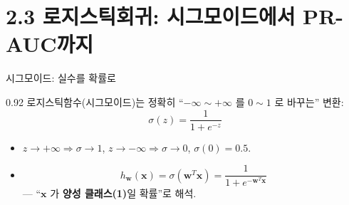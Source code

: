 \section{2.3 로지스틱회귀: 시그모이드에서 PR-AUC까지}
\begin{frame}{시그모이드: 실수를 확률로}
\begin{center}\begin{varwidth}{0.92\textwidth}
  로지스틱함수(시그모이드)는 정확히 ``$-\infty \sim +\infty$ 를
  $0 \sim 1$ 로 바꾸는'' 변환:
  \[
  \sigma(z) = \frac{1}{1+e^{-z}}
  \]
  \begin{itemize}
    \item $z \to +\infty \Rightarrow \sigma \to 1$, \;
      $z \to -\infty \Rightarrow \sigma \to 0$, \;
      $\sigma(0) = 0.5$.
    
    \item \[h_{\boldsymbol{w}}(\boldsymbol{x}) = \sigma(\boldsymbol{w}^T\boldsymbol{x}) = \frac{1}{1+e^{-\boldsymbol{w}^T\boldsymbol{x}}}\]
      --- ``$\boldsymbol{x}$ 가 \textbf{양성 클래스(1)}일 확률''로 해석.
  \end{itemize}
\end{varwidth}\end{center}
\end{frame}
